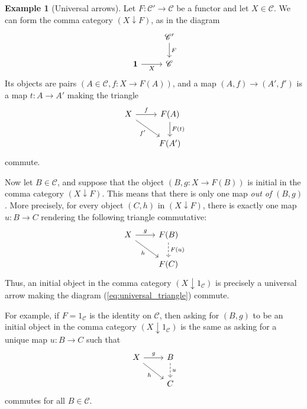 \documentclass[10pt,oneside]{book}
\def\~#1{\mathscr{#1}}
\theoremstyle{plain}
\theoremstyle{definition}
\newtheorem{ex}[thm]{Example}
\theoremstyle{remark}
\numberwithin{equation}{section}
\numberwithin{figure}{section}
\begin{document}
\begin{ex}[Universal arrows]
Let $F: \~C' \to \~C$ be a functor and let $X \in \~C$. We can form the comma category $(X \downarrow F)$, as in the diagram
\[\begin{tikzcd}
    & {\~C'} \\
    {\mathbf{1}} & {\~C}
    \arrow["{F}", from=1-2, to=2-2]
    \arrow["{X}"', from=2-1, to=2-2]
\end{tikzcd}\]
Its objects are pairs $\left(A \in \~C, f: X \to F(A)\right)$, and a map $(A, f) \to (A', f')$ is a map $t: A \to A'$ making the triangle 
\[\begin{tikzcd}
    X & {F(A)} \\
    & {F(A')}
    \arrow["f", from=1-1, to=1-2]
    \arrow["{f'}"', from=1-1, to=2-2]
    \arrow["{F(t)}", from=1-2, to=2-2]
\end{tikzcd}\]
commute. 

Now let $B \in \~C$, and suppose that the object $(B, g: X \to F(B))$ is initial in the comma category $(X \downarrow F)$. This means that there is only one map \emph{out of} $(B, g)$. More precisely, for every object $(C, h)$ in $(X \downarrow F)$, there is exactly one map $u: B \to C$ rendering the following triangle commutative:
 \begin{equation}
 \label{eq:universal_triangle}
 \begin{tikzcd}
    X & {F(B)} \\
    & {F(C)}
    \arrow["g", from=1-1, to=1-2]
    \arrow["{h}"', from=1-1, to=2-2]
    \arrow["{F(u)}", from=1-2, to=2-2, dashed]
\end{tikzcd}
\end{equation}
Thus, an initial object in the comma category $(X \downarrow 1_{\~C})$ is precisely a universal arrow making the diagram (\ref{eq:universal_triangle}) commute.

For example, if $F = 1_{\~C}$ is the identity on $\~C$, then asking for $(B, g)$ to be an initial object in the comma category $(X \downarrow 1_{\~C})$ is the same as asking for a unique map $u: B \to C$ such that
\[\begin{tikzcd}
X & {B} \\
& {C}
\arrow["g", from=1-1, to=1-2]
\arrow["{h}"', from=1-1, to=2-2]
\arrow["{u}", from=1-2, to=2-2, dashed]
\end{tikzcd}\]
commutes for all $B \in \~C$. 
\end{ex}
\end{document}
